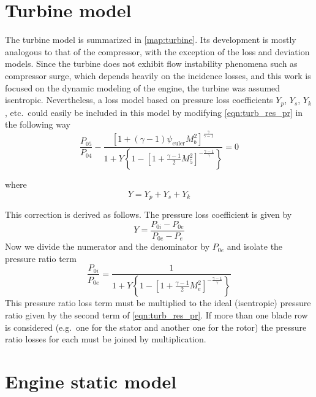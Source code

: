 \documentclass[tcc]{subfiles}
\begin{document}
\section{Turbine model}


The turbine model is summarized in \cref{map:turbine}. 
Its development is mostly analogous to that of the compressor, with the exception of the loss and deviation models. 
Since the turbine does not exhibit flow instability phenomena such as compressor surge, 
which depends heavily on the incidence losses, 
and this work is focused on the dynamic modeling of the engine, 
the turbine was assumed isentropic. 
Nevertheless, a loss model based on pressure loss coefficients $Y_p$, $Y_s$, $Y_k$, etc.\ 
could easily be included in this model by modifying \cref{eqn:turb_res_pr} in the following way
\begin{equation}
    \frac{P_{05}}{P_{04}} -\frac{[1 + (\gamma-1)\psi_{\text{euler}} M_b^2]^{\frac{\gamma}{\gamma-1}}}{1+Y\left\{1-\left[1+\tfrac{\gamma-1}{2}M_5^2\right]^{-\frac{\gamma-1}{\gamma}}\right\}} = 0 
\end{equation}

where
\begin{equation}
    Y = Y_p + Y_s + Y_k
\end{equation}

This correction is derived as follows. The pressure loss coefficient is given by
\begin{equation}
    Y = \frac{P_{0i} - P_{0e}}{P_{0e} - P_e}
\end{equation}
Now we divide the numerator and the denominator by $P_{0e}$ and isolate the pressure ratio term 
\begin{equation}
    \frac{P_{0i}}{P_{0e}} = \frac{1}{1+Y\left\{1-\left[1+\tfrac{\gamma-1}{2}M_e^2\right]^{-\frac{\gamma-1}{\gamma}}\right\}}
\end{equation}
This pressure ratio loss term must be multiplied to the ideal (isentropic) pressure ratio given by the second term of \cref{eqn:turb_res_pr}. If more than one blade row is considered (e.g.\ one for the stator and another one for the rotor) the pressure ratio losses for each must be joined by multiplication.




\section{Engine static model}
\end{document}

